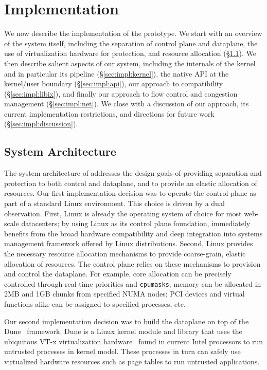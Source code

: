 
\section{Implementation}
\label{sec:impl}

We now describe the implementation of the \ix prototype. We start with
an overview of the system itself, including the separation of control
plane and dataplane, the use of virtualization hardware for
protection, and resource allocation (\S\ref{sec:impl:overview}). We
then describe salient aspects of our system, including the internals
of the \ix kernel and in particular its pipeline
(\S\ref{sec:impl:kernel}), the native API at the kernel/user boundary
(\S\ref{sec:impl:api}), our approach to compatibility
(\S\ref{sec:impl:libix}), and finally our approach to flow control and
congestion management (\S\ref{sec:impl:net}).  We close with a
discussion of our approach, its current implementation restrictions,
and directions for future work (\S\ref{sec:impl:discussion}).

\subsection{System Architecture}
\label{sec:impl:overview}



The system architecture of \ix addresses the design goals of providing
separation and protection to both control and dataplane, and to
provide an elastic allocation of resources.  Our first implementation
decision was to operate the control plane as part of a standard Linux
environment.  This choice is driven by a dual observation. First,
Linux is already the operating system of choice for most web-scale
datacenters; by using Linux as its control plane foundation, \ix
immediately benefits from the broad hardware compatibility and deep
integration into systems management framework offered by Linux
distributions. Second, Linux provides the necessary resource
allocation mechanisms to provide coarse-grain, elastic allocation of
resources.  The control plane relies on these mechanisms to
provision and control the dataplane.  For example, core allocation can
be precisely controlled through real-time priorities and
\texttt{cpumasks}; memory can be allocated in 2MB and 1GB chunks from
specified NUMA nodes; PCI devices and virtual functions alike can be
assigned to specified processes, etc.

Our second implementation decision was to build the \ix dataplane on
top of the Dune~\cite{belay2012dune} framework.  Dune is a Linux
kernel module and library that uses the ubiquitous VT-x
virtualization hardware~\cite{DBLP:journals/computer/UhligNRSMABKLS05}
found in current Intel processors to run untrusted processes in kernel
model.  These processes in turn can safely use virtualized hardware
resources such as page tables to run untrusted applications.

